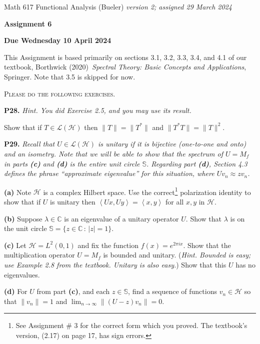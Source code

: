 \documentclass[12pt]{amsart}
\newcommand{\cH}{\mathcal{H}}
\newcommand{\cL}{\mathcal{L}}
\newcommand{\CC}{\mathbb{C}}
\newcommand{\ip}[2]{\ensuremath{\left<#1,#2\right>}}
\newcommand{\prob}[1]{\bigskip\noindent\textbf{#1.}\quad }
\newcommand{\epart}[1]{\medskip\noindent\textbf{(#1)}\quad }
\newcommand{\ds}{\displaystyle}
\begin{document}
\scriptsize \noindent Math 617 Functional Analysis (Bueler) \hfill \emph{version 2; assigned 29 March 2024}
\normalsize\medskip

\Large\centerline{\textbf{Assignment 6}}
\large
\medskip

\centerline{\textbf{Due Wednesday 10 April 2024}}
\medskip
\normalsize

\thispagestyle{empty}

\bigskip
\noindent This Assignment is based primarily on sections 3.1, 3.2, 3.3, 3.4, and 4.1 of our textbook, Borthwick (2020)~\emph{Spectral Theory: Basic Concepts and Applications}, Springer.  Note that 3.5 is skipped for now.

\medskip
\noindent \textsc{Please do the following exercises.}
\smallskip

\renewcommand{\SS}{\mathbb{S}}

\prob{P28}  \emph{Hint.  You did Exercise 2.5, and you may use its result.}

\medskip\noindent Show that if $T\in\cL(\cH)$ then $\|T\|=\|T^*\|$ and $\|T^*T\|=\|T\|^2$.


\prob{P29}  \emph{Recall that $U\in\cL(\cH)$ is \emph{unitary} if it is bijective (one-to-one and onto) and an isometry.  Note that we will be able to show that the spectrum of $U=M_f$ in parts \emph{\textbf{(c)}} and \emph{\textbf{(d)}} is the entire unit circle $\SS$.  Regarding part \emph{\textbf{(d)}}, Section 4.3 defines the phrase ``approximate eigenvalue'' for this situation, where $Uv_n \approx zv_n$.}

\epart{a}  Note $\cH$ is a complex Hilbert space.  Use the correct\footnote{See Assignment \# 3 for the correct form which you proved.  The textbook's version, (2.17) on page 17, has sign errors.} polarization identity to show that if $U$ is unitary then $\ip{Ux}{Uy}=\ip{x}{y}$ for all $x,y$ in $\cH$.

\epart{b}  Suppose $\lambda \in\CC$ is an eigenvalue of a unitary operator $U$.  Show that $\lambda$ is on the unit circle $\SS = \{z\in\CC\,:\,|z|=1\}$.

\epart{c}  Let $\cH = L^2(0,1)$ and fix the function $f(x) = e^{2\pi i x}$.  Show that the multiplication operator $U=M_f$ is bounded and unitary.  (\emph{Hint. Bounded is easy; use Example 2.8 from the textbook. Unitary is also easy.})  Show that this $U$ has no eigenvalues.

\epart{d}  For $U$ from part \textbf{(c)}, and each $z\in\SS$, find a sequence of functions $v_n\in\cH$ so that $\|v_n\|=1$ and $\ds \lim_{n\to\infty} \|(U-z)v_n\|=0$.
\end{document}
